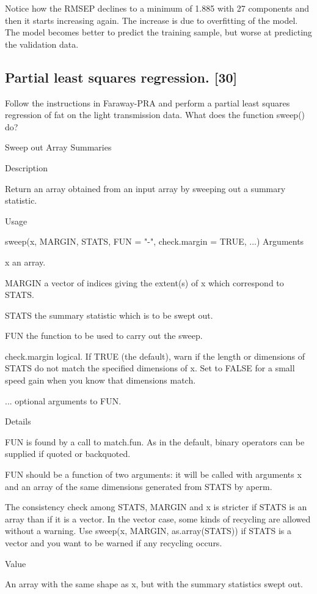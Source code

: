 \documentclass[letterpaper]{article}
\begin{document}
Notice how the RMSEP declines to a minimum of 1.885 with 27 components and then it starts increasing again. The increase is due to overfitting of the model. The model becomes better to predict the training sample, but worse at predicting the validation data.

\subsection {Partial least squares regression. [30]}

Follow the instructions in Faraway-PRA and perform a partial least squares regression of fat on the light transmission data. What does the function sweep() do?

Sweep out Array Summaries

Description

Return an array obtained from an input array by sweeping out a summary statistic.

Usage

sweep(x, MARGIN, STATS, FUN = "-", check.margin = TRUE, ...)
Arguments

x  
an array.

MARGIN	
a vector of indices giving the extent(s) of x which correspond to STATS.

STATS	
the summary statistic which is to be swept out.

FUN	
the function to be used to carry out the sweep.

check.margin	
logical. If TRUE (the default), warn if the length or dimensions of STATS do not match the specified dimensions of x. Set to FALSE for a small speed gain when you know that dimensions match.

...	
optional arguments to FUN.

Details

FUN is found by a call to match.fun. As in the default, binary operators can be supplied if quoted or backquoted.

FUN should be a function of two arguments: it will be called with arguments x and an array of the same dimensions generated from STATS by aperm.

The consistency check among STATS, MARGIN and x is stricter if STATS is an array than if it is a vector. In the vector case, some kinds of recycling are allowed without a warning. Use sweep(x, MARGIN, as.array(STATS)) if STATS is a vector and you want to be warned if any recycling occurs.

Value

An array with the same shape as x, but with the summary statistics swept out.
\end{document}

